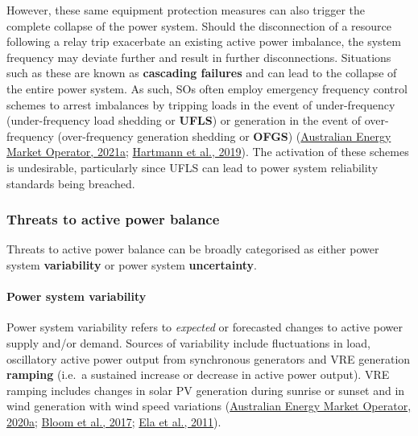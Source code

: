 \documentclass[12pt,a4paper,]{report}
\begin{document}
However, these same equipment protection measures can also trigger the
complete collapse of the power system. Should the disconnection of a
resource following a relay trip exacerbate an existing active power
imbalance, the system frequency may deviate further and result in
further disconnections. Situations such as these are known as
\textbf{cascading failures} and can lead to the collapse of the entire
power system. As such, SOs often employ emergency frequency control
schemes to arrest imbalances by tripping loads in the event of
under-frequency (under-frequency load shedding or \textbf{UFLS}) or
generation in the event of over-frequency (over-frequency generation
shedding or \textbf{OFGS})
(\protect\hyperlink{ref-australianenergymarketoperatorEnduringPrimaryFrequency2021}{Australian
Energy Market Operator, 2021a};
\protect\hyperlink{ref-hartmannEffectsDecreasingSynchronous2019}{Hartmann
et al., 2019}). The activation of these schemes is undesirable,
particularly since UFLS can lead to power system reliability standards
being breached.

\hypertarget{sec:lit_review-balancing_threats}{%
\subsubsection{Threats to active power
balance}\label{sec:lit_review-balancing_threats}}

Threats to active power balance can be broadly categorised as either
power system \textbf{variability} or power system \textbf{uncertainty}.

\hypertarget{power-system-variability}{%
\paragraph{Power system variability}\label{power-system-variability}}

Power system variability refers to \emph{expected} or forecasted changes
to active power supply and/or demand. Sources of variability include
fluctuations in load, oscillatory active power output from synchronous
generators and VRE generation \textbf{ramping} (i.e.~a sustained
increase or decrease in active power output). VRE ramping includes
changes in solar PV generation during sunrise or sunset and in wind
generation with wind speed variations
(\protect\hyperlink{ref-australianenergymarketoperatorRenewableIntegrationStudy2020}{Australian
Energy Market Operator, 2020a};
\protect\hyperlink{ref-bloomItIndisputableFive2017}{Bloom et al., 2017};
\protect\hyperlink{ref-elaOperatingReservesVariable2011}{Ela et al.,
2011}).
\end{document}
